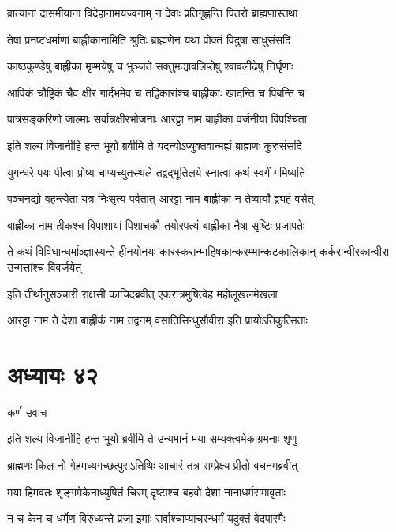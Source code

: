 \twolineshloka
{व्रात्यानां दासमीयानां विदेहानामयज्वनाम्}
{न देवाः प्रतिगृह्णन्ति पितरो ब्राह्मणास्तथा}


\twolineshloka
{तेषां प्रनष्टधर्माणां बाह्लीकानामिति श्रुतिः}
{ब्राह्मणेन यथा प्रोक्तं विदुषा साधुसंसदि}


\twolineshloka
{काष्ठकुण्डेषु बाह्लीका मृण्मयेषु च भुञ्जते}
{सक्तुमद्यावलिप्तेषु श्वावलीढेषु निर्घृणाः}


\twolineshloka
{आविकं चौष्ट्रिकं चैव क्षीरं गार्दभमेव च}
{तद्विकारांश्च बाह्लीकाः खादन्ति च पिबन्ति च}


\twolineshloka
{पात्रसङ्करिणो जाल्माः सर्वान्नक्षीरभोजनाः}
{आरट्टा नाम बाह्लीका वर्जनीया विपश्चिता}


\twolineshloka
{इति शल्य विजानीहि हन्त भूयो ब्रवीमि ते}
{यदन्योऽप्युक्तवान्मह्यं ब्राह्मणः कुरुसंसदि}


\twolineshloka
{युगन्धरे पयः पीत्वा प्रोष्य चाप्यच्युतस्थले}
{तद्वद्भूतिलये स्नात्वा कथं स्वर्गं गमिष्यति}


\twolineshloka
{पञ्चनद्यो वहन्त्येता यत्र निःसृत्य पर्वतात्}
{आरट्टा नाम बाह्लीका न तेष्वार्यो द्व्यहं वसेत्}


\twolineshloka
{बाह्लीका नाम हीकश्च विपाशायां पिशाचकौ}
{तयोरपत्यं बाह्लीका नैषा सृष्टिः प्रजापतेः}


ते कथं विविधान्धर्माञ्ज्ञास्यन्ते हीनयोनयः
\twolineshloka
{कारस्करान्माहिषकान्करम्भान्कटकालिकान्}
{कर्करान्वीरकान्वीरा उन्मत्तांश्च विवर्जयेत्}


\twolineshloka
{इति तीर्थानुसञ्चारी राक्षसी काचिदब्रवीत्}
{एकरात्रमुषित्वेह महोलूखलमेखला}


\twolineshloka
{आरट्टा नाम ते देशा बाह्लीकं नाम तद्वनम्}
{वसातिसिन्धुसौवीरा इति प्रायोऽतिकुत्सिताः}


\chapter{अध्यायः ४२}
\twolineshloka
{कर्ण उवाच}
{}


\twolineshloka
{इति शल्य विजानीहि हन्त भूयो ब्रवीमि ते}
{उन्यमानं मया सम्यक्त्वमेकाग्रमनाः शृणु}


\twolineshloka
{ब्राह्मणः किल नो गेहमध्यगच्छत्पुराऽतिथिः}
{आचारं तत्र सम्प्रेक्ष्य प्रीतो वचनमब्रवीत्}


\twolineshloka
{मया हिमवतः शृङ्गमेकेनाध्युषितं चिरम्}
{दृष्टाश्च बहवो देशा नानाधर्मसमावृताः}


\twolineshloka
{न च केन च धर्मेण विरुध्यन्ते प्रजा इमाः}
{सर्वाश्चाप्याचरन्धर्मं यदुक्तं वेदपारगैः}


